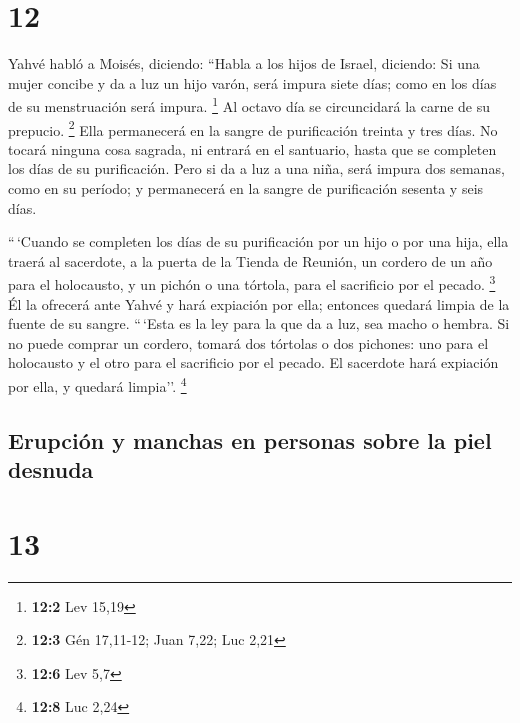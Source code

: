 \hypertarget{section-11}{%
\section{12}\label{section-11}}

 Yahvé habló a Moisés, diciendo:  ``Habla a
los hijos de Israel, diciendo: Si una mujer concibe y da a luz un hijo
varón, será impura siete días; como en los días de su menstruación será
impura. \footnote{\textbf{12:2} Lev 15,19}  Al octavo día
se circuncidará la carne de su prepucio. \footnote{\textbf{12:3} Gén
  17,11-12; Juan 7,22; Luc 2,21}  Ella permanecerá en la
sangre de purificación treinta y tres días. No tocará ninguna cosa
sagrada, ni entrará en el santuario, hasta que se completen los días de
su purificación.  Pero si da a luz a una niña, será impura
dos semanas, como en su período; y permanecerá en la sangre de
purificación sesenta y seis días.

 ``\,`Cuando se completen los días de su purificación por
un hijo o por una hija, ella traerá al sacerdote, a la puerta de la
Tienda de Reunión, un cordero de un año para el holocausto, y un pichón
o una tórtola, para el sacrificio por el pecado. \footnote{\textbf{12:6}
  Lev 5,7}  Él la ofrecerá ante Yahvé y hará expiación por
ella; entonces quedará limpia de la fuente de su sangre. ``\,`Esta es la
ley para la que da a luz, sea macho o hembra.  Si no puede
comprar un cordero, tomará dos tórtolas o dos pichones: uno para el
holocausto y el otro para el sacrificio por el pecado. El sacerdote hará
expiación por ella, y quedará limpia''. \footnote{\textbf{12:8} Luc 2,24}

\hypertarget{erupciuxf3n-y-manchas-en-personas-sobre-la-piel-desnuda}{%
\subsection{Erupción y manchas en personas sobre la piel
desnuda}\label{erupciuxf3n-y-manchas-en-personas-sobre-la-piel-desnuda}}

\hypertarget{section-12}{%
\section{13}\label{section-12}}

